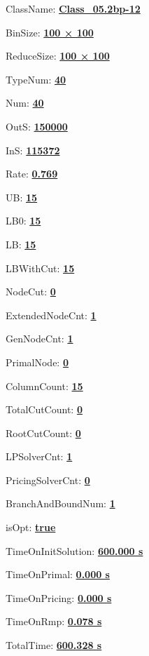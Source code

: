 \documentclass[11pt]{article}
\begin{document}
\pagestyle{empty}


ClassName: \underline{\textbf{Class_05.2bp-12}}
\par
BinSize: \underline{\textbf{100 × 100}}
\par
ReduceSize: \underline{\textbf{100 × 100}}
\par
TypeNum: \underline{\textbf{40}}
\par
Num: \underline{\textbf{40}}
\par
OutS: \underline{\textbf{150000}}
\par
InS: \underline{\textbf{115372}}
\par
Rate: \underline{\textbf{0.769}}
\par
UB: \underline{\textbf{15}}
\par
LB0: \underline{\textbf{15}}
\par
LB: \underline{\textbf{15}}
\par
LBWithCut: \underline{\textbf{15}}
\par
NodeCut: \underline{\textbf{0}}
\par
ExtendedNodeCnt: \underline{\textbf{1}}
\par
GenNodeCnt: \underline{\textbf{1}}
\par
PrimalNode: \underline{\textbf{0}}
\par
ColumnCount: \underline{\textbf{15}}
\par
TotalCutCount: \underline{\textbf{0}}
\par
RootCutCount: \underline{\textbf{0}}
\par
LPSolverCnt: \underline{\textbf{1}}
\par
PricingSolverCnt: \underline{\textbf{0}}
\par
BranchAndBoundNum: \underline{\textbf{1}}
\par
isOpt: \underline{\textbf{true}}
\par
TimeOnInitSolution: \underline{\textbf{600.000 s}}
\par
TimeOnPrimal: \underline{\textbf{0.000 s}}
\par
TimeOnPricing: \underline{\textbf{0.000 s}}
\par
TimeOnRmp: \underline{\textbf{0.078 s}}
\par
TotalTime: \underline{\textbf{600.328 s}}
\par
\newpage


\end{document}

